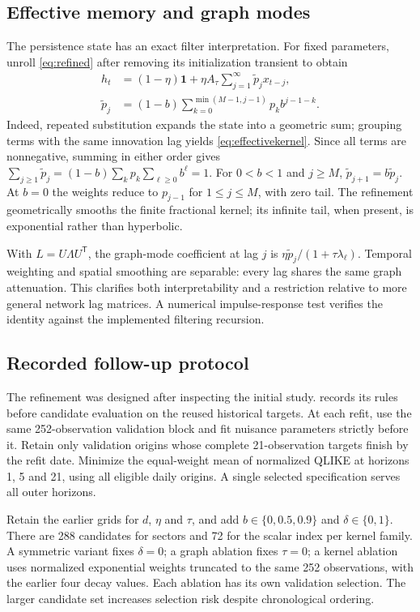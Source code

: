 \documentclass[12pt,a4paper]{article}
\newcommand{\one}{\mathbf 1}
\begin{document}
\subsection{Effective memory and graph modes}
The persistence state has an exact filter interpretation. For fixed parameters,
unroll \eqref{eq:refined} after removing its initialization transient to obtain
\begin{align}
h_t&=(1-\eta)\one+\eta A_\tau\sum_{j=1}^{\infty}\widetilde p_jx_{t-j},\\
\widetilde p_j&=(1-b)\sum_{k=0}^{\min(M-1,j-1)}p_k b^{j-1-k}.
\label{eq:effectivekernel}
\end{align}
Indeed, repeated substitution expands the state into a geometric sum; grouping
terms with the same innovation lag yields \eqref{eq:effectivekernel}. Since
all terms are nonnegative, summing in either order gives
$\sum_{j\ge1}\widetilde p_j=(1-b)\sum_kp_k\sum_{\ell\ge0}b^\ell=1$.
For $0<b<1$ and $j\ge M$, $\widetilde p_{j+1}=b\widetilde p_j$.
At $b=0$ the weights reduce to $p_{j-1}$ for $1\le j\le M$, with zero tail.
The refinement geometrically smooths the finite fractional kernel; its
infinite tail, when present, is exponential rather than hyperbolic.

With $L=U\Lambda U^{\mathsf T}$, the graph-mode coefficient at lag $j$ is
$\eta\widetilde p_j/(1+\tau\lambda_\ell)$. Temporal weighting and spatial
smoothing are separable: every lag shares the same graph attenuation. This
clarifies both interpretability and a restriction relative to more general
network lag matrices. A numerical impulse-response test verifies the identity
against the implemented filtering recursion.

\subsection{Recorded follow-up protocol}
The refinement was designed after inspecting the initial study.
 records its rules before candidate
evaluation on the reused historical targets. At each refit, use the same 252-observation validation
block and fit nuisance parameters strictly before it. Retain only validation
origins whose complete 21-observation targets finish by the refit date. Minimize
the equal-weight mean of normalized QLIKE at horizons 1, 5 and 21, using all
eligible daily origins. A single selected specification serves all outer horizons.

Retain the earlier grids for $d$, $\eta$ and $\tau$, and add
$b\in\{0,0.5,0.9\}$ and $\delta\in\{0,1\}$. There are 288 candidates for
sectors and 72 for the scalar index per kernel family. A symmetric variant fixes
$\delta=0$; a graph ablation fixes $\tau=0$; a kernel ablation uses normalized
exponential weights truncated to the same 252 observations, with the earlier
four decay values. Each ablation has its own validation selection. The larger
candidate set increases selection risk despite chronological ordering.
\end{document}
